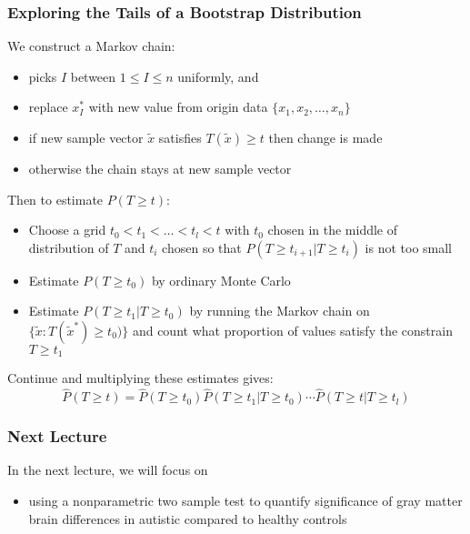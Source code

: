 \documentclass[10pt]{beamer}
\begin{document}
\begin{frame}
\frametitle{Exploring the Tails of a Bootstrap Distribution}

We construct a Markov chain: 
\begin{itemize}
\item picks $I$ between $1 \le I \le n$ uniformly, and
\item replace $x_I^*$ with new value from origin data $\{ x_1, x_2, \dots, x_n \}$
\item if new sample vector $\tilde{x}$ satisfies $T(\tilde{x}) \ge t$ then change is made 
\item otherwise the chain stays at new sample vector 
\end{itemize}

\vspace{0.3cm}
Then to estimate $P( T \ge t)$:
\begin{itemize}
\item Choose a grid $t_0 < t_1 < \dots < t_l < t$ with $t_0$ chosen in the middle of distribution of $T$ and $t_i$ chosen so that $P(T \ge t_{i+1} | T \ge t_i) $ is not too small 
\item Estimate $P( T \ge t_0 )$ by ordinary Monte Carlo 
\item Estimate $P( T \ge t_1 | T \ge t_0)$ by running the Markov chain on $\{ \tilde{x}: T(\tilde{x}^*) \ge t_0) \}$ and count what proportion of values satisfy the constrain $T \ge t_1$
\end{itemize}

\vspace{0.3cm}
Continue and multiplying these estimates gives:
\[ \widehat{P}(T \ge t) = \widehat{P}(T \ge t_0) \widehat{P}(T \ge t_1 | T \ge t_0) \cdots \widehat{P}(T \ge t | T \ge t_l) \]

\end{frame}

\begin{frame}
\frametitle{Next Lecture}

In the next lecture, we will focus on
\begin{itemize}
\item using a nonparametric two sample test to quantify significance of gray matter brain differences in autistic compared to healthy controls
\end{itemize}

\end{frame}

\end{document}
